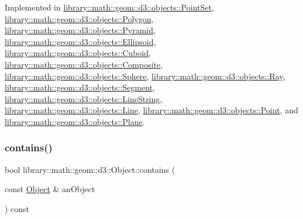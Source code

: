 Implemented in \hyperlink{classlibrary_1_1math_1_1geom_1_1d3_1_1objects_1_1_point_set_ab7c4ec1d48795973be648f0907b84484}{library\+::math\+::geom\+::d3\+::objects\+::\+Point\+Set}, \hyperlink{classlibrary_1_1math_1_1geom_1_1d3_1_1objects_1_1_polygon_a54440dcce091424ecabdacc30892c2fc}{library\+::math\+::geom\+::d3\+::objects\+::\+Polygon}, \hyperlink{classlibrary_1_1math_1_1geom_1_1d3_1_1objects_1_1_pyramid_a734bc02bbfec62647743649bf5d2b706}{library\+::math\+::geom\+::d3\+::objects\+::\+Pyramid}, \hyperlink{classlibrary_1_1math_1_1geom_1_1d3_1_1objects_1_1_ellipsoid_a8982455e000708f1b7e4caf728e7ad40}{library\+::math\+::geom\+::d3\+::objects\+::\+Ellipsoid}, \hyperlink{classlibrary_1_1math_1_1geom_1_1d3_1_1objects_1_1_cuboid_ae60199a546a4d4de479f891c3b1db05a}{library\+::math\+::geom\+::d3\+::objects\+::\+Cuboid}, \hyperlink{classlibrary_1_1math_1_1geom_1_1d3_1_1objects_1_1_composite_a8d1d598683fe3149498b55a089217686}{library\+::math\+::geom\+::d3\+::objects\+::\+Composite}, \hyperlink{classlibrary_1_1math_1_1geom_1_1d3_1_1objects_1_1_sphere_a58370a8ff15b7c5a48cf4ffec5be3015}{library\+::math\+::geom\+::d3\+::objects\+::\+Sphere}, \hyperlink{classlibrary_1_1math_1_1geom_1_1d3_1_1objects_1_1_ray_a247ea36c39c3b44d003b157689850ae4}{library\+::math\+::geom\+::d3\+::objects\+::\+Ray}, \hyperlink{classlibrary_1_1math_1_1geom_1_1d3_1_1objects_1_1_segment_a589ad56339616f362cee84a2ecab61a4}{library\+::math\+::geom\+::d3\+::objects\+::\+Segment}, \hyperlink{classlibrary_1_1math_1_1geom_1_1d3_1_1objects_1_1_line_string_a95ef100ab7053589b845980ca4c845b3}{library\+::math\+::geom\+::d3\+::objects\+::\+Line\+String}, \hyperlink{classlibrary_1_1math_1_1geom_1_1d3_1_1objects_1_1_line_a55382b24007bccdae721176d0f73536f}{library\+::math\+::geom\+::d3\+::objects\+::\+Line}, \hyperlink{classlibrary_1_1math_1_1geom_1_1d3_1_1objects_1_1_point_a32aa1e233c6ac5341605961f6bf0f210}{library\+::math\+::geom\+::d3\+::objects\+::\+Point}, and \hyperlink{classlibrary_1_1math_1_1geom_1_1d3_1_1objects_1_1_plane_a0b6a4ae7bef06f3995f8fd9d32a88870}{library\+::math\+::geom\+::d3\+::objects\+::\+Plane}.

\mbox{\label{classlibrary_1_1math_1_1geom_1_1d3_1_1_object_abaf45bf02ca165ba7bf685b24f5f97ef}} 
\subsubsection{\texorpdfstring{contains()}{contains()}}
{\footnotesize\ttfamily bool library\+::math\+::geom\+::d3\+::\+Object\+::contains (\begin{DoxyParamCaption}\item[{const \hyperlink{classlibrary_1_1math_1_1geom_1_1d3_1_1_object}{Object} \&}]{an\+Object }\end{DoxyParamCaption}) const\hspace{0.3cm}{\ttfamily [virtual]}}




